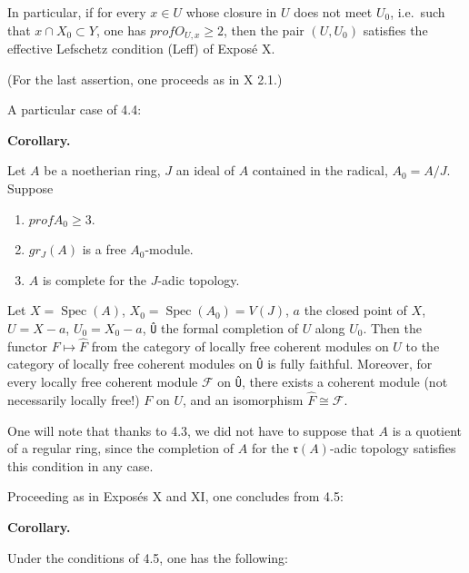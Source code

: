 \documentclass[
  11pt,
  a4paper,
]{book}
\providecommand{\tightlist}{%
  \setlength{\itemsep}{0pt}\setlength{\parskip}{0pt}}
\begin{document}
In particular, if for every \(x \in U\) whose closure in \(U\) does not
meet \(U_{0}\), i.e.~such that \({x} \cap X_{0} \subset
Y\), one has \(prof O_{U,x} \geqslant 2\), then the pair \((U, U_{0})\)
satisfies the effective Lefschetz condition (Leff) of Exposé X.

(For the last assertion, one proceeds as in X 2.1.)

A particular case of 4.4:

\textbf{Corollary.}

Let \(A\) be a noetherian ring, \(J\) an ideal of \(A\) contained in the
radical, \(A_{0} = A/J\). Suppose

\begin{enumerate}
\def\labelenumi{\arabic{enumi}.}
\tightlist
\item
  \(prof A_{0} \geqslant 3\).
\item
  \(gr_{J}(A)\) is a free \(A_{0}\)-module.
\item
  \(A\) is complete for the \(J\)-adic topology.
\end{enumerate}

Let \(X = \operatorname{Spec}(A)\),
\(X_{0} = \operatorname{Spec}(A_{0}) = V(J)\), \(a\) the closed point of
\(X\), \(U = X -
{a}\), \(U_{0} = X_{0} - {a}\), \texttt{Û} the formal completion of
\(U\) along \(U_{0}\). Then the functor \(F \mapsto \hat{F}\) from the
category of locally free coherent modules on \(U\) to the category of
locally free coherent modules on \texttt{Û} is fully faithful. Moreover,
for every locally free coherent module \(\mathcal{F}\) on \texttt{Û},
there exists a coherent module (not necessarily locally free!) \(F\) on
\(U\), and an isomorphism \(\hat{F} \cong \mathcal{F}\).

One will note that thanks to 4.3, we did not have to suppose that \(A\)
is a quotient of a regular ring, since the completion of \(A\) for the
\(\mathfrak{r}(A)\)-adic topology satisfies this condition in any case.

Proceeding as in Exposés X and XI, one concludes from 4.5:

\textbf{Corollary.}

Under the conditions of 4.5, one has the following:
\end{document}
